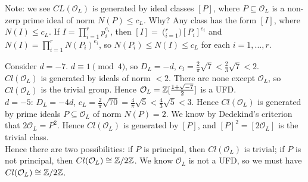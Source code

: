 \documentclass[a4paper]{article}
\begin{document}
Note: we see $CL(\mathcal{O}_L)$ is generated by ideal classes $[P]$, where $P \subseteq \mathcal{O}_L$ is a non-zerp prime ideal of norm $N(P) \leq c_L$. Why? Any class has the form $[I]$, where $N(I) \leq c_L$. If $I = \prod_{i=1}^r p_i^{e_i}$, then $[I] = \pod_{i=1}^r [P_i]^{e_i}$ and $N(I) = \prod_{i=1}^r N(P_i)^{e_i}$, so $N(P_i) \leq N(I) \leq c_L$ for each $i=1,...,r$.

\begin{eg}
Consider $d=-7$. $d \equiv 1\pmod 4$, so $D_L = -d$, $c_l = \frac{2}{\pi} \sqrt{7} < \frac{2}{3} \sqrt{7} < 2$.\\
$Cl(\mathcal{O}_L)$ is generated by ideals of norm $<2$. There are none except $\mathcal{O}_L$, so $Cl(\mathcal{O}_L)$ is the trivial group. Hence $\mathcal{O}_L = \mathbb{Z}[\frac{1+\sqrt{-7}}{2}]$ is a UFD.\\
$d=-5$: $D_L = -4d$, $c_L = \frac{2}{\pi} \sqrt{70} = \frac{4}{\pi} \sqrt{5} < \frac{4}{3}\sqrt{5} < 3$. Hence $Cl(\mathcal{O}_L)$ is generated by prime ideals $P \subseteq \mathcal{O}_L$ of norm $N(P) = 2$. We know by Dedekind's criterion that $2\mathcal{O}_L = P^2$. Hence $Cl(\mathcal{O}_L)$ is generated by $[P]$, and $[P]^2 = [2\mathcal{O}_L]$ is the trivial class.\\
Hence there are two possibilities: if $P$ is principal, then $Cl(\mathcal{O}_L)$ is trivial; if $P$ is not principal, then $Cl(\mathcal{O}_L) \cong \mathbb{Z}/2\mathbb{Z}$. We know $\mathcal{O}_L$ is not a UFD, so we must have $Cl(\mathcal{O}_L) \cong \mathbb{Z}/2\mathbb{Z}$.
\end{eg}

\iffalse
\begin{equation*}
\begin{aligned}

\end{aligned}
\end{equation*}
\fi
\end{document}
